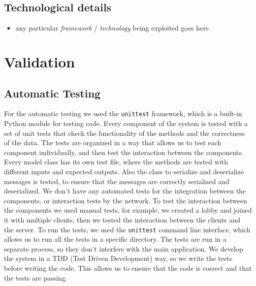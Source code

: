 \documentclass{scrartcl}
\begin{document}
\subsection{Technological details}\label{technological-details}

\begin{itemize}
    \item any particular \emph{framework} / \emph{technology} being exploited
          goes here
\end{itemize}

\section{Validation}\label{validation}

\subsection{Automatic Testing}\label{automatic-testing}
For the automatic testing we used the \texttt{unittest} framework, which is a built-in Python module for testing code. Every component of the system is tested with a set of unit tests that check the functionality of the methods and the correctness of the data. \newline
The tests are organized in a way that allows us to test each component individually, and then test the interaction between the components. \newline
Every model class has its own test file, where the methods are tested with different inputs and expected outputs. Also the class to serialize and deserialize messages is tested, to ensure that the messages are correctly serialized and deserialized. \newline
We don't have any automated tests for the integration between the components, or interaction tests by the network. To test the interaction between the components we used manual tests, for example, we created a lobby and joined it with multiple clients, then we tested the interaction between the clients and the server. \newline
To run the tests, we used the \texttt{unittest} command line interface, which allows us to run all the tests in a specific directory. The tests are run in a separate process, so they don't interfere with the main application. \newline
We develop the system in a TDD (Test Driven Development) way, so we write the tests before writing the code. This allows us to ensure that the code is correct and that the tests are passing. \newline
\end{document}

